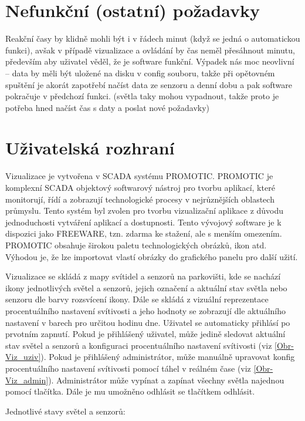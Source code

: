 \section{Nefunkční (ostatní) požadavky}

Reakční časy by klidně mohli být i v řádech minut (když se jedná o automatickou funkci), avšak v případě vizualizace a ovládání by čas neměl přesáhnout minutu, především aby uživatel věděl, že je software funkční.
Výpadek nás moc neovlivní -- data by měli být uložené na disku v config souboru, takže při opětovném spuštění je akorát zapotřebí načíst data ze senzoru a denní dobu a pak software pokračuje v předchozí funkci. (světla taky mohou vypadnout, takže proto je potřeba hned načíst čas s daty a poslat nové požadavky)


\section{Uživatelská rozhraní}

Vizualizace je vytvořena v SCADA systému PROMOTIC. PROMOTIC je komplexní SCADA objektový softwarový nástroj pro tvorbu aplikací, které monitorují, řídí a zobrazují technologické procesy v nejrůznějších oblastech průmyslu. Tento systém byl zvolen pro tvorbu vizualizační aplikace z důvodu jednoduchosti vytváření aplikací a dostupnosti. Tento vývojový software je k dispozici jako FREEWARE, tzn. zdarma ke stažení, ale s menším omezením. PROMOTIC obsahuje širokou paletu technologických obrázků, ikon atd. Výhodou je, že lze importovat vlastí obrázky do grafického panelu pro další užití. \parencite{PROMOTIC}

Vizualizace se skládá z mapy svítidel a senzorů na parkovišti, kde se nachází ikony jednotlivých světel a senzorů, jejich označení a aktuální stav světla nebo senzoru dle barvy rozsvícení ikony. Dále se skládá z vizuální reprezentace procentuálního nastavení svítivosti a jeho hodnoty se zobrazují dle aktuálního nastavení v barech pro určitou hodinu dne. Uživatel se automaticky přihlásí po prvotním zapnutí. Pokud je přihlášený uživatel, může jedině sledovat aktuální stav světel a senzorů a konfiguraci procentuálního nastavení svítivosti (viz \autoref{Obr-Viz_uziv}). Pokud je přihlášený administrátor, může manuálně upravovat konfig procentuálního nastavení svítivosti pomocí táhel v reálném čase (viz \autoref{Obr-Viz_admin}). Administrátor může vypínat a zapínat všechny světla najednou pomocí tlačítka. Dále je mu umožněno odhlásit se tlačítkem odhlásit. 


Jednotlivé stavy světel a senzorů:

